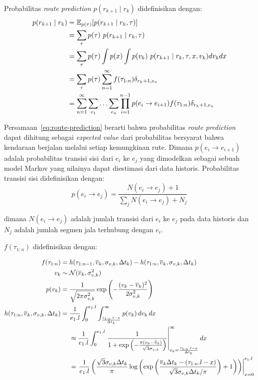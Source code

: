 Probabilitas \textit{route prediction} $p(r_{k+1}\mid r_k)$ didefinisikan dengan:
\begin{align}
p(r_{k+1}\mid r_k)&= \mathbb{E}_{p(\tau)}[p(r_{k+1} \mid r_k, \tau)] \notag \\
&=\sum_{\tau}p(\tau) \ p(r_{k+1} \mid r_k, \tau)  \notag \\
&=\sum_{\tau}p(\tau)\int p(x) \int p(v_k)\  p(r_{k+1}\mid r_k,\tau, x , v_k)dv_kdx \notag \\
&=\sum_{\tau}p(\tau)\sum_{n=1}^{\infty}f(\tau_{1:n})\delta_{r_k+1,e_n}  \notag 
\\&=\sum_{n=1}^{\infty}\sum_{e_1}\ldots\sum_{e_n}\prod_{i=1}^{n-1}p(e_i\rightarrow e_{i+1})f(\tau_{1:n})\delta_{r_k+1,e_n} 
\label{eq:route-prediction}
\end{align}

Persamaan~\ref{eq:route-prediction} berarti bahwa probabilitas \textit{route prediction} dapat dihitung sebagai \textit{expected value} dari probabilitas bersyarat bahwa kendaraan berjalan melalui setiap kemungkinan rute. Dimana $p(e_i\rightarrow e_{i+1})$ adalah probabilitas transisi sisi dari $e_i$ ke $e_j$ yang dimodelkan sebagai sebuah model Markov yang nilainya dapat diestimasi dari data historis. Probabilitas transisi sisi didefinisikan dengan:
\begin{equation}
p(e_i\rightarrow e_j)=\frac{N(e_i\rightarrow e_j) + 1}{\sum_{j}N(e_i\rightarrow e_j)+N_j}
\end{equation}

dimana $N(e_i\rightarrow e_j)$ adalah jumlah transisi dari $e_i$ ke $e_j$ pada data historis dan $N_j$ adalah jumlah segmen jala terhubung dengan $e_i$.


$f(\tau_{1:n})$ didefinisikan dengan:

\begin{align}
    f(\tau_{1:n}) 
    &= h(\tau_{1:n-1},\overline{v}_k,\sigma_{v,k},\Delta t_k) 
    - h(\tau_{1:n},\overline{v}_k,\sigma_{v,k},\Delta t_k) \\
    v_k&\sim \mathcal{N}(\overline{v}_k,\sigma^2_{v,k})  \notag  \\
    p(v_k)
    &=\frac{1}{\sqrt{2\pi\sigma_{v,k}^2}}\exp\left(-\frac{(v_k-\overline{v}_k)^2}{2\sigma_{v,k}^2}\right)\\
    h(\tau_{1:n},\overline{v}_k,\sigma_{v,k},\Delta t_k) 
    &= \begin{aligned}[t]
        &\frac{1}{e_1.l}\int_0^{e_1.l}\int_{\frac{\tau_{1:n}.l - x}{\Delta t_k}}^{\infty} p(v_k)\,dv_k\,dx \\
        &\approx \frac{1}{e_1.l} \int_0^{e_1.l} 
        \left. \frac{1}{1+\exp \left(-\frac{\pi(v_k-\overline{v}_k)}{\sqrt{3}\sigma_{v,k}} \right)}\right|_{v_k=\frac{\tau_{1:n}.l - x}{\Delta t_k}}^{\infty} dx \\
        &= \left. \frac{1}{e_1.l} \left(\frac{\sqrt{3}\sigma_{v,k}\Delta t_k}{\pi} \log \left( \exp\left( \frac{\overline{v}_k\Delta t_k-(\tau_{1:n}.l - x)}{\sqrt{3}\sigma_{v,k}\Delta t_k/\pi} \right)+1 \right) \right) \right|_{x=0}^{e_1.l}
    \end{aligned}
\end{align}


